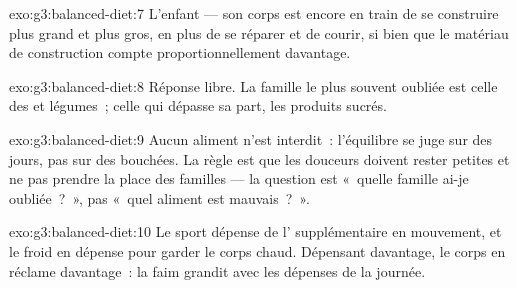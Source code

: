 \begin{solution}{exo:g3:balanced-diet:7}
L'enfant --- son corps est encore en train de se construire plus
grand et plus gros, en plus de se réparer et de courir, si bien que
le matériau de construction compte proportionnellement davantage.
\end{solution}

\begin{solution}{exo:g3:balanced-diet:8}
Réponse libre. La famille le plus souvent oubliée est celle des
 et légumes~; celle qui dépasse sa part, les produits sucrés.
\end{solution}

\begin{solution}{exo:g3:balanced-diet:9}
Aucun aliment n'est interdit~: l'équilibre se juge sur des jours,
pas sur des bouchées. La règle est que les douceurs doivent rester
petites et ne pas prendre la place des familles --- la question est
«~quelle famille ai-je oubliée~?~», pas «~quel aliment est
mauvais~?~».
\end{solution}

\begin{solution}{exo:g3:balanced-diet:10}
Le sport dépense de l' supplémentaire en mouvement, et le
froid en dépense pour garder le corps chaud. Dépensant davantage, le
corps en réclame davantage~: la faim grandit avec les dépenses de la
journée.
\end{solution}
